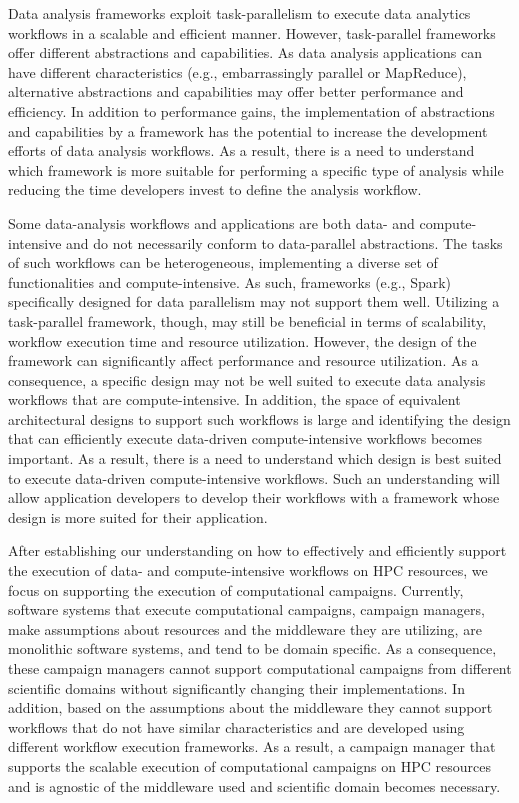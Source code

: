 Data analysis frameworks exploit task-parallelism to execute data analytics
workflows in a scalable and efficient manner. However, task-parallel frameworks
offer different abstractions and capabilities. As data analysis applications
can have different characteristics (e.g., embarrassingly parallel or
MapReduce), alternative abstractions and capabilities may offer better
performance and efficiency. In addition to performance gains, the
implementation of abstractions and capabilities by a framework has the
potential to increase the development efforts of data analysis
workflows. As a result, there is a need to understand which framework is more
suitable for performing a specific type of analysis while reducing the time
developers invest to define the analysis workflow.

Some data-analysis workflows and applications are both data- and
compute-intensive and do not necessarily conform to data-parallel abstractions.
The tasks of such workflows can be heterogeneous, implementing a diverse set of
functionalities and compute-intensive. As such, frameworks (e.g., Spark)
specifically designed for data parallelism may not support them well. Utilizing
a task-parallel framework, though, may still be beneficial in terms of
scalability, workflow execution time and resource utilization. However, the
design of the framework can significantly affect performance and resource
utilization. As a consequence, a specific design may not be well suited to
execute data analysis workflows that are compute-intensive. In addition, the
space of equivalent architectural designs to support such workflows is large
and identifying the design that can efficiently execute data-driven
compute-intensive workflows becomes important. As a result, there is a need to
understand which design is best suited to execute data-driven compute-intensive
workflows. Such an understanding will allow application developers to develop
their workflows with a framework whose design is more suited for their
application.

After establishing our understanding on how to effectively and efficiently
support the execution of data- and compute-intensive workflows on HPC
resources, we focus on supporting the execution of computational campaigns.
Currently, software systems that execute computational campaigns, campaign
managers, make assumptions about resources and the middleware they are
utilizing, are monolithic software systems, and tend to be domain specific. As
a consequence, these campaign managers cannot support computational campaigns
from different scientific domains without significantly changing their
implementations. In addition, based on the assumptions about the middleware
they cannot support workflows that do not have similar characteristics and are
developed using different workflow execution frameworks. As a result, a
campaign manager that supports the scalable execution of computational
campaigns on HPC resources and is agnostic of the middleware used and
scientific domain becomes necessary.

